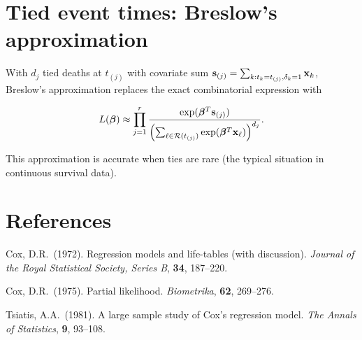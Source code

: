 \section*{Tied event times: Breslow's approximation}

With $d_j$ tied deaths at $t_{(j)}$ with covariate sum $\mathbf{s}_{(j)} = \sum_{k : t_k = t_{(j)}, \delta_k = 1} \mathbf{x}_k$, Breslow's approximation replaces the exact combinatorial expression with

\[
L(\boldsymbol{\beta}) \approx \prod_{j=1}^r \frac{\exp(\boldsymbol{\beta}^T\mathbf{s}_{(j)})}{\left(\sum_{\ell \in \mathcal{R}(t_{(j)})} \exp(\boldsymbol{\beta}^T\mathbf{x}_\ell)\right)^{d_j}}.
\]

This approximation is accurate when ties are rare (the typical situation in continuous survival data).

\section*{References}

Cox, D.R.\ (1972). Regression models and life-tables (with discussion). \textit{Journal of the Royal Statistical Society, Series B}, \textbf{34}, 187--220.

Cox, D.R.\ (1975). Partial likelihood. \textit{Biometrika}, \textbf{62}, 269--276.

Tsiatis, A.A.\ (1981). A large sample study of Cox's regression model. \textit{The Annals of Statistics}, \textbf{9}, 93--108.


